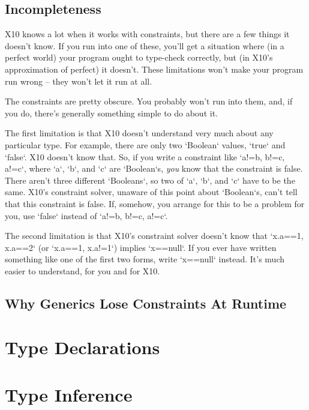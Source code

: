 \subsection{Incompleteness}

X10 knows a lot when it works with constraints, but there are a few things it
doesn't know.  If you run into one of these, you'll get a situation where (in
a perfect world) your program ought to type-check correctly, but (in X10's
approximation of perfect)  it doesn't.  These limitations won't make your
program run wrong -- they won't let it run at all.

The constraints are pretty obscure.  You probably won't run into them, and, if
you do, there's generally something simple to do about it.

The first limitation is that X10 doesn't understand very much about any
particular type.  For example, there are only two \xcd`Boolean` values,
\xcd`true` and \xcd`false`.  X10 doesn't know that.  So, if you write a
constraint like \xcd`{a!=b, b!=c, a!=c}`, where \xcd`a`, \xcd`b`, and \xcd`c`
are \xcd`Boolean`s, {\em you} know that the constraint is false.  There aren't
three different \xcd`Booleans`, so two of \xcd`a`, \xcd`b`, and \xcd`c` have
to be the same.  X10's constraint solver, unaware of this point about
\xcd`Boolean`s, can't tell that this constraint is false. 
If, somehow, you arrange for this to be a problem for you, use \xcd`false`
instead of 
\xcd`{a!=b, b!=c, a!=c}`.

The second limitation is that X10's constraint solver doesn't know that
\xcd`{x.a==1, x.a==2}` (or \xcd`{x.a==1, x.a!=1}`) implies \xcd`x==null`.
If you ever have written something like one of the first two forms, write
\xcd`x==null` instead.  It's much easier to understand, for you and for X10.


\subsection{Why Generics Lose Constraints At Runtime}



\section{Type Declarations}
\label{sect:TypeDecl}
\section{Type Inference}

